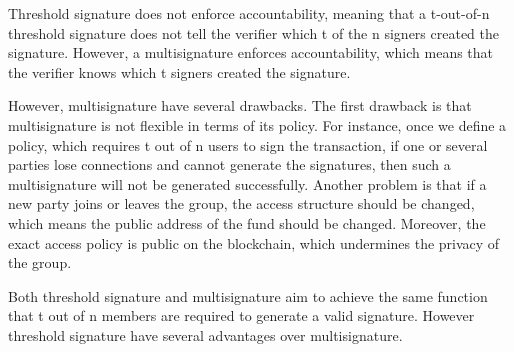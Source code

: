 \documentclass[12pt]{report}
\begin{document}
Threshold signature does not enforce accountability, meaning that a t-out-of-n threshold signature does not tell the verifier which t of the n signers created the signature. However, a multisignature enforces accountability, which means that the verifier knows which t signers created the signature.

However, multisignature have several drawbacks. The first drawback is that multisignature is not flexible in terms of its policy. For instance, once we define a policy, which requires t out of n users to sign the transaction, if one or several parties lose connections and cannot generate the signatures, then such a multisignature will not be generated successfully. Another problem is that if a new party joins or leaves the group, the access structure should be changed, which means the public address of the fund should be changed. Moreover, the exact access policy is public on the blockchain, which undermines the privacy of the group.

Both threshold signature and multisignature aim to achieve the same function that t out of n members are required to generate a valid signature. However threshold signature have several advantages over multisignature. 
\end{document}
